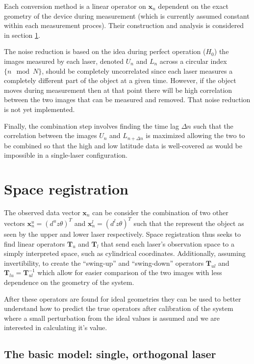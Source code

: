 Each conversion method is a linear operator on $\mathbf{x}_{n}$
dependent on the exact geometry of the device during measurement
(which is currently assumed constant within each measurement
proces). Their construction and analysis is considered in section
\ref{sec:space-registration}. 

The noise reduction is based on the idea during perfect operation
($H_{0}$) the images measured by each laser, denoted $U_{n}$ and
$L_{n}$ across a circular index $\{n\mod N\}$, should be completely
uncorrelated since each laser measures a completely different part of
the object at a given time. However, if the object moves during
measurement then at that point there will be high correlation between
the two images that can be measured and removed. That noise reduction
is not yet implemented.

Finally, the combination step involves finding the time lag $\Delta n$
such that the correlation between the images $U_{n}$ and $L_{n+\Delta
  n}$ is maximized allowing the two to be combined so that the high
and low latitude data is well-covered as would be impossible in a
single-laser configuration.

\section{Space registration}
\label{sec:space-registration}

The observed data vector $\mathbf{x}_{n}$ can be consider the
combination of two other vectors $\mathbf{x}^{u}_{n} = (d^{u} z
\theta)^{T}$ and $\mathbf{x}^{l}_{n} = (d^{l} z \theta)^{T}$ such that
the represent the object as seen by the upper and lower laser
respectively. Space registration thus seeks to find linear operators
$\mathbf{T}_{u}$ and $\mathbf{T}_{l}$ that send each laser's
observation space to a simply interpreted space, such as cylindrical
coordinates. Additionally, assuming invertibility, to create the
``swing-up'' and ``swing-down'' operators $\mathbf{T}_{ul}$ and
$\mathbf{T}_{lu} = \mathbf{T}_{ul}^{-1}$ which allow for easier
comparison of the two images with less dependence on the geometry of
the system.

After these operators are found for ideal geometries they can be used
to better understand how to predict the true operators after
calibration of the system where a small perturbation from the ideal
values is assumed and we are interested in calculating it's value.

\subsection{The basic model: single, orthogonal laser}
\label{sec:basic-model:orthogonal}

